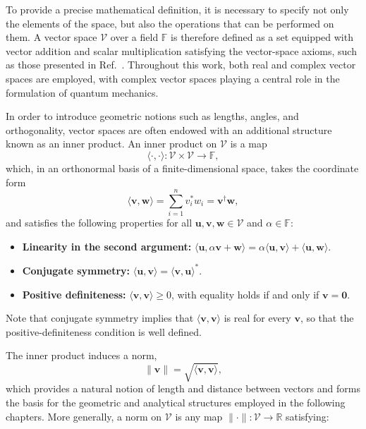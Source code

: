 To provide a precise mathematical definition, it is necessary to specify not only the elements of the space, but also the operations that can be performed on them. A vector space $\mathcal{V}$ over a field $\mathbb{F}$ is therefore defined as a set equipped with vector addition and scalar multiplication satisfying the vector-space axioms, such as those presented in Ref.~\cite{Devaud2001}. Throughout this work, both real and complex vector spaces are employed, with complex vector spaces playing a central role in the formulation of quantum mechanics.

In order to introduce geometric notions such as lengths, angles, and orthogonality, vector spaces are often endowed with an additional structure known as an inner product. An inner product on $\mathcal{V}$ is a map
\begin{equation}
    \langle \cdot , \cdot \rangle : \mathcal{V} \times \mathcal{V} \to \mathbb{F},
\end{equation}
which, in an orthonormal basis of a finite-dimensional space, takes the coordinate form
\begin{equation}
    \langle \mathbf{v}, \mathbf{w} \rangle
    = \sum_{i=1}^{n} v_i^{*} w_i
    = \mathbf{v}^\dagger \mathbf{w},
\end{equation}
and satisfies the following properties for all $\mathbf{u}, \mathbf{v}, \mathbf{w} \in \mathcal{V}$ and $\alpha \in \mathbb{F}$:
\begin{itemize}
    \item \textbf{Linearity in the second argument:} $\langle \mathbf{u}, \alpha \mathbf{v} + \mathbf{w} \rangle = \alpha \langle \mathbf{u}, \mathbf{v} \rangle + \langle \mathbf{u}, \mathbf{w} \rangle$.
    \item \textbf{Conjugate symmetry:} $\langle \mathbf{u}, \mathbf{v} \rangle = \langle \mathbf{v}, \mathbf{u} \rangle^{*}$.
    \item \textbf{Positive definiteness:} $\langle \mathbf{v}, \mathbf{v} \rangle \geq 0$, with equality holds if and only if $\mathbf{v} = \mathbf{0}$.
\end{itemize}
Note that conjugate symmetry implies that $\langle \mathbf{v}, \mathbf{v} \rangle$ is real for every $\mathbf{v}$, so that the positive-definiteness condition is well defined.

The inner product induces a norm,
\begin{equation}
    \|\mathbf{v}\| = \sqrt{\langle \mathbf{v}, \mathbf{v} \rangle},
\end{equation}
which provides a natural notion of length and distance between vectors and forms the basis for the geometric and analytical structures employed in the following chapters. More generally, a norm on $\mathcal{V}$ is any map $\|\cdot\| : \mathcal{V} \to \mathbb{R}$ satisfying:

